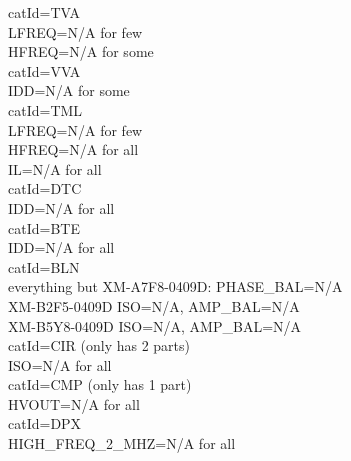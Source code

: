 \documentclass[11pt]{article}
\begin{document}
catId=TVA\\
  LFREQ=N/A for few\\
  HFREQ=N/A for some\\
catId=VVA\\
  IDD=N/A for some\\
catId=TML\\
  LFREQ=N/A for few\\
  HFREQ=N/A for all\\
  IL=N/A for all\\
catId=DTC\\
  IDD=N/A for all\\
catId=BTE\\
  IDD=N/A for all\\
catId=BLN\\
  everything but XM-A7F8-0409D: PHASE\_BAL=N/A\\
  XM-B2F5-0409D ISO=N/A, AMP\_BAL=N/A\\
  XM-B5Y8-0409D ISO=N/A, AMP\_BAL=N/A\\
catId=CIR (only has 2 parts)\\
   ISO=N/A for all\\
catId=CMP (only has 1 part)\\
  HVOUT=N/A for all\\
catId=DPX\\
  HIGH\_FREQ\_2\_MHZ=N/A for all\\
\end{document}
